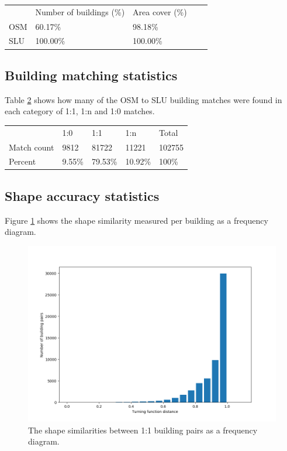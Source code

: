 \documentclass{kththesis}
\begin{document}
\begin{table}[H]
    \begin{tabular}{lllll}
        & Number of buildings (\%) & Area cover (\%) \\
        OSM & 60.17\% & 98.18\% \\
        SLU & 100.00\% & 100.00\%
    \end{tabular}
    \label{table:num-of-buildings-percent}
\end{table}

\subsection{Building matching statistics}

Table \ref{table:building-matching} shows how many of the OSM to SLU building matches were found in each category of 1:1, 1:n and 1:0 matches.

\begin{table}[H]
    \begin{tabular}{lllll}
        & 1:0 & 1:1 & 1:n & Total \\
        Match count & 9812   & 81722   & 11221   & 102755 \\
        Percent     & 9.55\% & 79.53\% & 10.92\% & 100\%
    \end{tabular}
    \label{table:building-matching}
\end{table}

\subsection{Shape accuracy statistics}

Figure \ref{fig:bar-plot-similarity} shows the shape similarity measured per building as a frequency diagram.

\begin{figure}[H]
    \centering
    \includegraphics[width=\textwidth,height=0.5\textheight,keepaspectratio]{img_turning_function_plot}
    \caption{The shape similarities between 1:1 building pairs as a frequency diagram.}
    \label{fig:bar-plot-similarity}
\end{figure}
\end{document}
